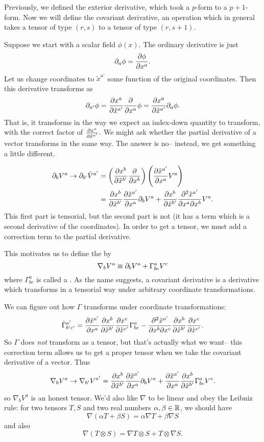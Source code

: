 Previously, we defined the exterior derivative, which took a $p$-form to a $p+1$-form. Now we will define the covariant derivative, an operation which in general takes a tensor of type $(r,s)$ to a tensor of type $(r,s+1)$.

Suppose we start with a scalar field $\phi(x)$. The ordinary derivative is just
$$\partial_a \phi=\frac{\partial \phi}{\partial {x^a}}.$$
Let us change coordinates to ${\tilde x^{a'}}$ some function of the original coordinates. Then this derivative transforms as
$$\partial_{a'}\phi= \frac{\partial x^a}{\partial {\tilde x}^{a'}} \frac{\partial }{\partial x^a}\phi = \frac{\partial x^a}{\partial {\tilde x}^{a'}}\partial_a \phi.$$
That is, it transforms in the way we expect an index-down quantity to transform, with the correct factor of $\frac{\partial x^a}{\partial {\tilde x}^{a'}}.$
We might ask whether the partial derivative of a vector transforms in the same way. The answer is no-- instead, we get something a little different.

\begin{align*}
\partial_{b} V^{a}\to \partial_{b'} \tilde V^{a'} &= \left(\frac{\partial x^b}{\partial \tilde x^{b'}} \frac{\partial }{\partial x^b}\right) \left( \frac{ \partial \tilde x^{a'}}{\partial x^a} V^a\right)\\
&=\frac{\partial x^b}{\partial \tilde x^{b'}} \frac{\partial \tilde x^{a'}}{\partial x^a} \partial_b V^a+ \frac{\partial x^b}{\partial \tilde x^{b'}}\frac{\partial^2 \tilde x^{a'}}{\partial x^a \partial x^b}V^a.
\end{align*}
This first part is tensorial, but the second part is not (it has a term which is a second derivative of the coordinates). In order to get a tensor, we must add a correction term to the partial derivative. 
\begin{defn}
This motivates us to define the  by
$$\nabla_b V^a \equiv \partial_b V^a +\Gamma^a_{bc} V^c$$
where $\Gamma^a_{bc}$ is called a . As the name suggests, a covariant derivative is a derivative which transforms in a tensorial way under arbitrary coordinate transformations.
\end{defn}
We can figure out how $\Gamma$ transforms under coordinate transformations:
$$\tilde \Gamma^{a'}_{b'c'}=\frac{\partial \tilde x^{a'}}{\partial x^a} \frac{ \partial x^b}{\partial \tilde x^{b'}}\frac{\partial x^c}{\partial \tilde x^{c'}} \Gamma^a_{bc}-\frac{\partial^2 \tilde x^{a'}}{\partial x^b \partial x^c}\frac{\partial x^b}{\partial \tilde x^{b'}}\frac{\partial x^c}{\partial\tilde x^{c'}}.$$
So $\Gamma$ does \emph{not} transform as a tensor, but that's actually what we want-- this correction term allows us to get a proper tensor when we take the covariant derivative of a vector. Thus
$$\nabla_b V^a \to \nabla_{b'}V^{a'}=\frac{\partial x^b}{\partial \tilde x^{b'}} \frac{\partial \tilde x^{a'}}{\partial x^a}\partial_b V^a+\frac{\partial \tilde x^{a'}}{\partial x^a} \frac{ \partial x^b}{\partial \tilde x^{b'}} \Gamma^a_{bc} V^c.$$
so $\nabla_b V^a$ is an honest tensor. We'd also like $\nabla$ to be linear and obey the Leibniz rule: for two tensors $T,S$ and two real numbers $\alpha,\beta\in \mathbb{R}$, we should have
$$\nabla(\alpha T+\beta S)= \alpha \nabla T+\beta \nabla S$$
and also
$$\nabla(T\otimes S)=\nabla T \otimes S + T\otimes \nabla S.$$

